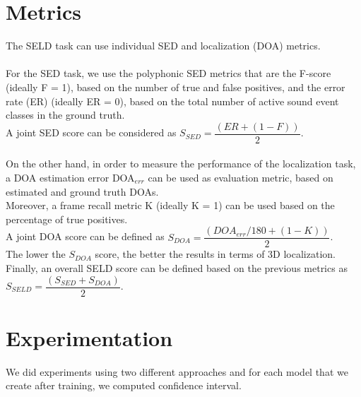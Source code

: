 \documentclass{article}
\begin{document}
    \section{Metrics}
    The SELD task can use individual SED and localization (DOA) metrics.
    \\ \\ For the SED task, we use the polyphonic SED metrics that are the F-score (ideally F = 1), based on the number of true and false positives, and the error rate (ER) (ideally ER = 0), based on the total number of active sound event classes in the ground truth.\\
    A joint SED score can be considered as $S_{SED} = \dfrac{(ER+(1-F))}{2}$.
    \\ \\ On the other hand, in order to measure the performance of the localization task, a DOA estimation error DOA$_{err}$ can be used as evaluation metric, based on estimated and ground truth DOAs.\\ Moreover, a frame recall metric K (ideally K = 1) can be used based on the percentage of true positives. \\
    A joint DOA score can be defined as $S_{DOA} = \dfrac{(DOA_{err}/180 + (1 - K))}{2}$.\\
    The lower the $S_{DOA}$ score, the better the results in terms of 3D localization.
    Finally, an overall SELD score can be defined based on the previous metrics as $S_{SELD} = \dfrac{(S_{SED} + S_{DOA})}{2}$.
    \section{Experimentation}
    We did experiments using two different approaches and for each model that we create after training, we computed confidence interval.
\end{document}
